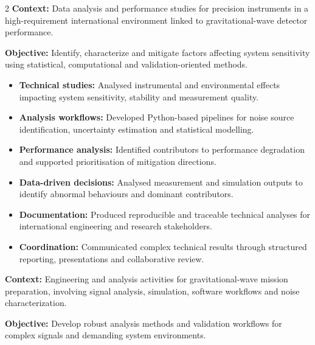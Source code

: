 \documentclass[8pt,a4paper,ragged2e,withhyper]{altacv}
\begin{document}
\begin{paracol}{2}
\textbf{Context:} Data analysis and performance studies for precision instruments in a high-requirement international environment linked to gravitational-wave detector performance.

\textbf{Objective:} Identify, characterize and mitigate factors affecting system sensitivity using statistical, computational and validation-oriented methods.

\begin{itemize}
  \item \textbf{Technical studies:} Analysed instrumental and environmental effects impacting system sensitivity, stability and measurement quality.
  \item \textbf{Analysis workflows:} Developed Python-based pipelines for noise source identification, uncertainty estimation and statistical modelling.
  \item \textbf{Performance analysis:} Identified contributors to performance degradation and supported prioritisation of mitigation directions.
  \item \textbf{Data-driven decisions:} Analysed measurement and simulation outputs to identify abnormal behaviours and dominant contributors.
  \item \textbf{Documentation:} Produced reproducible and traceable technical analyses for international engineering and research stakeholders.
  \item \textbf{Coordination:} Communicated complex technical results through structured reporting, presentations and collaborative review.
\end{itemize}

\divider


\textbf{Context:} Engineering and analysis activities for gravitational-wave mission preparation, involving signal analysis, simulation, software workflows and noise characterization.

\textbf{Objective:} Develop robust analysis methods and validation workflows for complex signals and demanding system environments.


\end{paracol}
\end{document}
